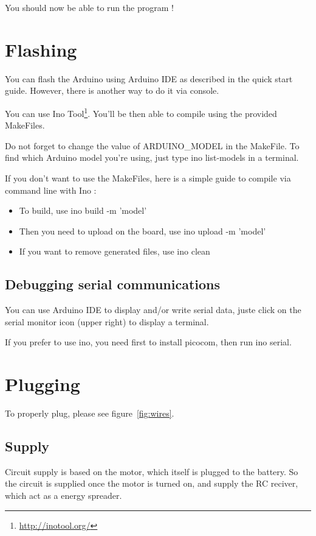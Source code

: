 \documentclass[a4paper,11pt]{report}
\begin{document}
You should now be able to run the program !

\section{Flashing}
\label{sec:Flashing} %

You can flash the Arduino using Arduino IDE as described in the quick start
guide. However, there is another way to do it via console.

You can use Ino Tool\footnote{\url{http://inotool.org/}}. You'll be then able
to compile using the provided MakeFiles.

Do not forget to change the value of ARDUINO\_MODEL in the MakeFile. To find
which Arduino model you're using, just type ino list-models in a terminal.

If you don't want to use the MakeFiles, here is a simple guide to compile via
command line with Ino :
\begin{itemize}
    \item To build, use ino build -m 'model' 
    \item Then you need to upload on the board, use ino upload -m 'model'
    \item If you want to remove generated files, use ino clean
\end{itemize}

\subsection{Debugging serial communications}

You can use Arduino IDE to display and/or write serial data, juste click on the
serial monitor icon (upper right) to display a terminal.

If you prefer to use ino, you need first to install picocom, then run ino
serial.

\section{Plugging}
To properly plug, please see figure~\ref{fig:wires}.

\subsection{Supply}
Circuit supply is based on the motor, which itself is plugged to the
battery. So the circuit is supplied once the motor is turned on, and supply the
RC reciver, which act as a energy spreader.
\end{document}
